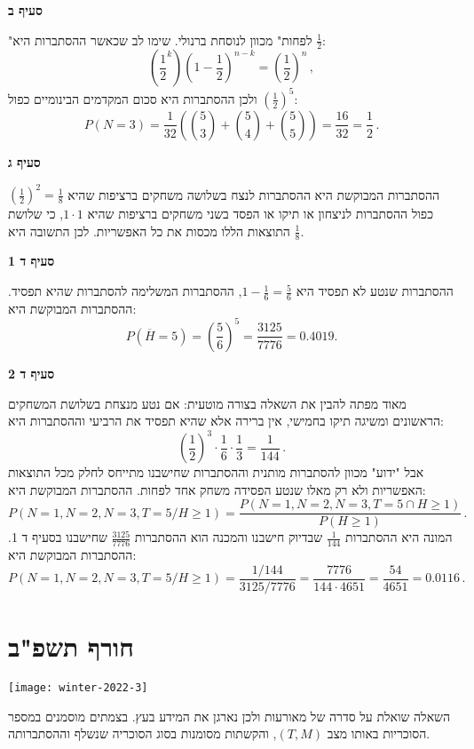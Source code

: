 \textbf{סעיף ב}

"לפחות" מכוון לנוסחת ברנולי. שימו לב שכאשר ההסתברות היא 
$\frac{1}{2}$:
\[
\left(\frac{1}{2}^k\right)\left(1-\frac{1}{2}\right)^{n-k}=\left(\frac{1}{2}\right)^n\,,
\]
ולכן ההסתברות היא סכום המקדמים הבינומיים כפול 
$\left(\frac{1}{2}\right)^5$:
\[
P(N=3)=\frac{1}{32}\left({5\choose 3}+{5\choose 4}+{5\choose 5}\right)=\frac{16}{32}=\frac{1}{2}\,.
\]

\textbf{סעיף ג}

ההסתברות המבוקשת היא ההסתברות לנצח בשלושה משחקים ברציפות שהיא
$\left(\frac{1}{2}\right)^2=\frac{1}{8}$
כפול ההסתברות לניצחון או תיקו או הפסד בשני משחקים ברציפות שהיא
$1\cdot 1$,
כי שלושת התוצאות הללו מכסות את כל האפשריות. לכן התשובה היא
$\frac{1}{8}$.

\textbf{סעיף ד 1}

ההסתברות שנטע לא תפסיד היא
$1-\frac{1}{6}=\frac{5}{6}$,
ההסתברות המשלימה להסתברות שהיא תפסיד. ההסתברות המבוקשת היא:
\[
P(\overline{H}=5)=\left(\frac{5}{6}\right)^5=\frac{3125}{7776}=0.4019.
\]

\textbf{סעיף ד 2}

מאוד מפתה להבין את השאלה בצורה מוטעית: אם נטע מנצחת בשלושת המשחקים הראשונים ומשיגה תיקו בחמישי, אין ברירה אלא שהיא תפסיד את הרביעי וההסתברות היא:
\[
\left(\frac{1}{2}\right)^3\cdot \frac{1}{6}\cdot \frac{1}{3}=\frac{1}{144}\,.
\]
אבל "ידוע" מכוון להסתברות מותנית וההסתברות שחישבנו מתייחס לחלק מכל התוצאות האפשריות ולא רק מאלו שנטע הפסידה משחק אחד לפחות. ההסתברות המבוקשת היא:
\[
P(N=1,N=2,N=3,T=5/H\geq 1)=\frac{P(N=1,N=2,N=3,T=5\cap H\geq 1)}{P(H\geq 1)}\,.
\]
המונה היא ההסתברות
$\frac{1}{144}$
שבדיוק חישבנו והמכנה הוא ההסתברות
$\frac{3125}{7776}$
שחישבנו בסעיף ד 1. ההסתברות המבוקשת היא:
\[
P(N=1,N=2,N=3,T=5/H\geq 1)=\frac{1/144}{3125/7776}=
\frac{7776}{144\cdot 4651}=\frac{54}{4651}=0.0116\,.
\]


\newpage

\section{חורף תשפ"ב}

\begin{center}
\texttt{[image: winter-2022-3]}
\end{center}

השאלה שואלת על סדרה של מאורעות ולכן נארגן את המידע בעץ. בצמתים מוסמנים במספר הסוכריות באותו מצב
$(T, M)$,
והקשתות מסומנות בסוג הסוכריה שנשלף וההסתברותה.

